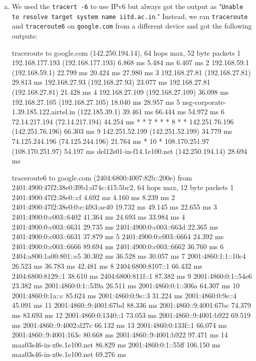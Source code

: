 \begin{enumerate}[a.]
    \item We used the {\tt tracert -6} to use IPv6 but always got the output as "{\tt Unable to resolve target system name iitd.ac.in}." 
    Instead, we ran {\tt traceroute} and {\tt traceroute6} on {\tt google.com} from a different device and got the following outputs:
    \begin{code}
traceroute to google.com (142.250.194.14), 64 hops max, 52 byte packets
1  192.168.177.193 (192.168.177.193)  6.868 ms  5.484 ms  6.407 ms
2  192.168.59.1 (192.168.59.1)  22.799 ms  20.424 ms  27.980 ms
3  192.168.27.81 (192.168.27.81)  29.813 ms
    192.168.27.93 (192.168.27.93)  23.077 ms
    192.168.27.81 (192.168.27.81)  21.428 ms
4  192.168.27.109 (192.168.27.109)  36.098 ms
    192.168.27.105 (192.168.27.105)  18.040 ms  28.957 ms
5  nsg-corporate-1.39.185.122.airtel.in (122.185.39.1)  39.461 ms  66.444 ms  54.972 ms
6  72.14.217.194 (72.14.217.194)  44.254 ms * *
7  * * *
8  * * 142.251.76.196 (142.251.76.196)  66.303 ms
9  142.251.52.199 (142.251.52.199)  34.779 ms
    74.125.244.196 (74.125.244.196)  21.764 ms *
10  * 108.170.251.97 (108.170.251.97)  54.197 ms
    del12s01-in-f14.1e100.net (142.250.194.14)  28.694 ms
    \end{code}
    \begin{code}
traceroute6 to google.com (2404:6800:4007:82b::200e) from 2401:4900:47f2:38e0:39b1:d74c:415:5bc2, 
64 hops max, 12 byte packets
1  2401:4900:47f2:38e0::cf  4.692 ms  4.160 ms  8.239 ms
2  2401:4900:47f2:38e0:0:e:4f83:ae40  19.732 ms  49.145 ms  22.655 ms
3  2401:4900:0:c003::6402  41.364 ms  24.693 ms  33.984 ms
4  2401:4900:0:c003::6631  29.735 ms
    2401:4900:0:c003::663d  22.365 ms
    2401:4900:0:c003::6631  37.879 ms
5  2401:4900:0:c003::6664  24.392 ms
    2401:4900:0:c003::6666  89.694 ms
    2401:4900:0:c003::6662  36.760 ms
6  2404:a800:1a00:801::e5  30.302 ms  36.528 ms  30.057 ms
7  2001:4860:1:1::10c4  26.523 ms  36.783 ms  42.481 ms
8  2404:6800:8107::1  66.432 ms
    2404:6800:8129::1  38.610 ms
    2404:6800:811f::1  87.382 ms
9  2001:4860:0:1::54e6  23.382 ms
    2001:4860:0:1::539a  26.511 ms
    2001:4860:0:1::306a  64.307 ms
10  2001:4860:0:1a::c  85.624 ms
    2001:4860:0:9e::3  31.224 ms
    2001:4860:0:9e::4  45.091 ms
11  2001:4860::9:4001:67bd  88.336 ms
    2001:4860::9:4001:67bc  74.379 ms  83.693 ms
12  2001:4860:0:1340::1  73.053 ms
    2001:4860::9:4001:b922  69.519 ms
    2001:4860::9:4002:d27c  66.132 ms
13  2001:4860:0:133f::1  66.074 ms
    2001:4860::9:4001:163c  80.668 ms
    2001:4860::9:4001:b922  97.471 ms
14  maa03s46-in-x0e.1e100.net  86.829 ms
    2001:4860:0:1::55ff  106.150 ms
    maa03s46-in-x0e.1e100.net  69.276 ms
    \end{code}

\end{enumerate}
